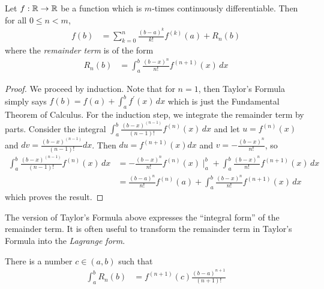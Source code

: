 \begin{thm}\label{TaylorsTheorem}Let $f: \mathbb{R}\to
  \mathbb{R}$ be a function which is $m$-times continuously differentiable.  Then for all
  $0 \leq n < m$,
\begin{align*}
f(b) &= \sum_{k=0}^n \frac{(b-a)^k}{k!} f^{(k)}(a) + R_n(b)
\end{align*}
where the \emph{remainder term} is of the form
\begin{align*}
R_n(b) &= \int_a^b
\frac{(b-x)^n}{n!} f^{(n+1)}(x) \, dx
\end{align*}
\end{thm}
\begin{proof}
We proceed by induction.  Note that for $n=1$, then Taylor's Formula simply says $f(b) = f(a) +
\int_a^b f^\prime(x) \, dx$ which is just the Fundamental Theorem of
Calculus.  For the induction step, we integrate the remainder term by parts.  Consider
the integral $\int_a^b \frac{(b-x)^{(n-1)}}{(n-1)!} f^{(n)}(x) \, dx$ and let
$u = f^{(n)}(x)$ and $dv = \frac{(b-x)^{(n-1)}}{(n-1)!} dx$.  Then $du =
f^{(n+1)}(x) dx$ and $v = -\frac{(b-x)^n}{n!}$, so 
\begin{align*}
\int_a^b \frac{(b-x)^{(n-1)}}{(n-1)!} f^{(n)}(x) \, dx &=
-\frac{(b-x)^n}{n!} f^{(n)}(x) \mid_a^b + \int_a^b \frac{(b-x)^n}{n!}
f^{(n+1)}(x) \, dx \\
&= \frac{(b-a)^n}{n!} f^{(n)}(a) + \int_a^b \frac{(b-x)^n}{n!}
f^{(n+1)}(x) \, dx
\end{align*}
which proves the result.
\end{proof}
The version of Taylor's Formula above expresses the ``integral form''
of the remainder term.  It is often useful to transform the remainder term in Taylor's Formula
into the \emph{Lagrange form}.
\begin{lem}\label{LagrangeFormRemainder}There is a number $c \in
  (a,b)$ such that 
\begin{align*}
\int_a^b R_n(b)&= f^{(n+1)}(c) \frac{(b-a)^{n+1}}{(n+1)!}
\end{align*}
\end{lem}
